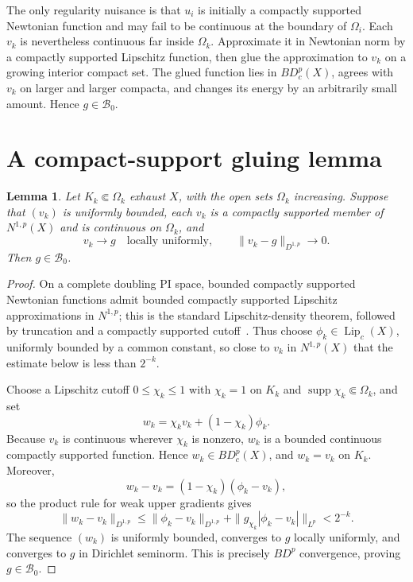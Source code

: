 \documentclass[11pt]{article}
\newtheorem{lemma}{Lemma}
\newcommand{\BDc}{BD_c^p(X)}
\begin{document}
The only regularity nuisance is that $u_i$ is initially a compactly supported
Newtonian function and may fail to be continuous at the boundary of
$\Omega_i$.  Each $v_k$ is nevertheless continuous far inside $\Omega_k$.
Approximate it in Newtonian norm by a compactly supported Lipschitz function,
then glue the approximation to $v_k$ on a growing interior compact set.  The
glued function lies in $\BDc$, agrees with $v_k$ on larger and larger
compacta, and changes its energy by an arbitrarily small amount.  Hence
$g\in\mathcal B_0$.

\section{A compact-support gluing lemma}

\begin{lemma}\label{lem:glue}
Let $K_k\Subset\Omega_k$ exhaust $X$, with the open sets $\Omega_k$
increasing.  Suppose that $(v_k)$ is uniformly bounded, each $v_k$ is a
compactly supported member of $N^{1,p}(X)$ and is continuous on $\Omega_k$,
and
\[
 v_k\longrightarrow g\quad\text{locally uniformly},
 \qquad
 \|v_k-g\|_{D^{1,p}}\longrightarrow0.
\]
Then $g\in\mathcal B_0$.
\end{lemma}

\begin{proof}
On a complete doubling PI space, bounded compactly supported Newtonian
functions admit bounded compactly supported Lipschitz approximations in
$N^{1,p}$; this is the standard Lipschitz-density theorem, followed by
truncation and a compactly supported cutoff~\cite{BB,Sh0}.  Thus choose
$\phi_k\in\operatorname{Lip}_c(X)$, uniformly bounded by a common constant,
so close to $v_k$ in $N^{1,p}(X)$ that the estimate below is less than
$2^{-k}$.

Choose a Lipschitz cutoff $0\leq\chi_k\leq1$ with $\chi_k=1$ on $K_k$ and
$\operatorname{supp}\chi_k\Subset\Omega_k$, and set
\[
 w_k=\chi_kv_k+(1-\chi_k)\phi_k.
\]
Because $v_k$ is continuous wherever $\chi_k$ is nonzero, $w_k$ is a
bounded continuous compactly supported function.  Hence $w_k\in\BDc$, and
$w_k=v_k$ on $K_k$.  Moreover,
\[
 w_k-v_k=(1-\chi_k)(\phi_k-v_k),
\]
so the product rule for weak upper gradients gives
\[
 \|w_k-v_k\|_{D^{1,p}}
 \leq \|\phi_k-v_k\|_{D^{1,p}}
      +\|g_{\chi_k}|\phi_k-v_k|\|_{L^p}<2^{-k}.
\]
The sequence $(w_k)$ is uniformly bounded, converges to $g$ locally
uniformly, and converges to $g$ in Dirichlet seminorm.  This is precisely
$BD^p$ convergence, proving $g\in\mathcal B_0$.
\end{proof}
\end{document}
